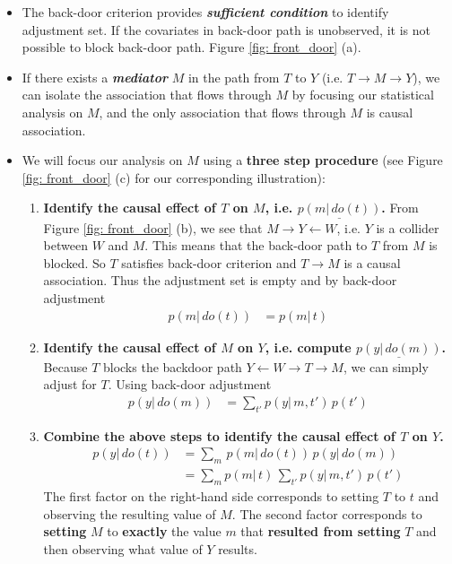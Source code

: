 \documentclass[11pt]{article}
\begin{document}
\begin{itemize}
\item The back-door criterion provides \emph{\textbf{sufficient condition}} to identify adjustment set. If the covariates in back-door path is unobserved, it is not possible to block back-door path. Figure \ref{fig: front_door} (a). 

\item If there exists a \emph{\textbf{mediator}} $M$ in the path from $T$ to $Y$ (i.e. $T\rightarrow M \rightarrow Y$), we can isolate the association that flows through $M$ by focusing our statistical analysis on $M$, and the only association that flows through $M$ is causal association.

\item We will focus our analysis on $M$ using a \textbf{three step procedure} (see Figure \ref{fig: front_door} (c) for our corresponding illustration):
\begin{enumerate}
\item \textbf{Identify the causal effect of $T$ on $M$, i.e. $\underline{p(m|\,do(t))}$.} From Figure \ref{fig: front_door} (b), we see that $M\rightarrow Y \leftarrow W$, i.e. $Y$ is a collider between $W$ and $M$. This means that the back-door path to $T$ from $M$ is blocked. So $T$ satisfies back-door criterion and $T\rightarrow M$ is a causal association. Thus the adjustment set is empty and by back-door adjustment
\begin{align*}
p(m|\, do(t)) &= p(m|\, t)
\end{align*} 
\item \textbf{Identify the causal effect of $M$ on $Y$, i.e. compute $\underline{p(y |\, do(m))}$.} Because $T$ blocks the backdoor path $Y\leftarrow W \rightarrow T \rightarrow M$, we can simply adjust for $T$. Using back-door adjustment
\begin{align*}
p(y | \, do(m)) &= \sum_{t'}p(y|\, m, t')\,p(t')
\end{align*}

\item \textbf{Combine the above steps to identify the causal effect of $T$ on $Y$.}
\begin{align*}
p(y | \, do(t)) &= \sum_{m} \,p(m|\, do(t))\, p(y | \, do(m))  \\
&= \sum_{m}p(m|\, t)\,\sum_{t'}p(y|\, m, t')\,p(t')
\end{align*} The first factor on the right-hand side corresponds to setting $T$ to $t$ and observing the resulting value of $M$. The second factor corresponds
to \textbf{setting} $M$ to \textbf{exactly} the value $m$ that \textbf{resulted from setting} $T$ and then observing what value of $Y$ results. 
\end{enumerate}


\end{itemize}
\end{document}
